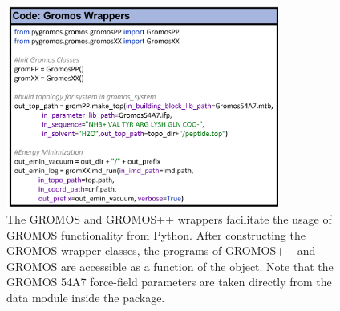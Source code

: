 \begin{figure}[h]
    \centering
    \includegraphics[width=0.8\textwidth]{fig/ApplicationExamples/codeExample_GROMOSWrapper.png}
    \caption{The GROMOS and GROMOS++ wrappers facilitate the usage of GROMOS functionality from Python. After constructing the GROMOS wrapper classes, the programs of GROMOS++ and GROMOS are accessible as a function of the object. Note that the GROMOS 54A7 force-field parameters are taken directly from the data module inside the package.}
    \label{fig: GROMOSWrappers}
\end{figure}


\FloatBarrier